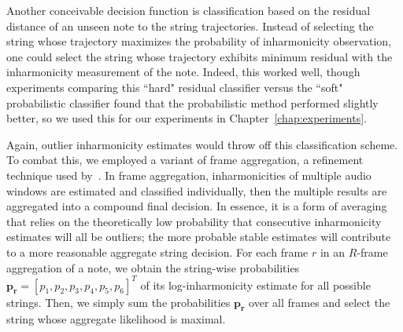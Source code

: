 \documentclass[12pt]{cmuthesis}
\DeclareMathOperator*{\argmax}{arg\,max}
\begin{document}
Another conceivable decision function is classification based on the residual distance of an unseen note to the string trajectories. Instead of selecting the string whose trajectory maximizes the probability of inharmonicity observation, one could select the string whose trajectory exhibits minimum residual with the inharmonicity measurement of the note. Indeed, this worked well, though experiments comparing this ``hard" residual classifier versus the ``soft" probabilistic classifier found that the probabilistic method performed slightly better, so we used this for our experiments in Chapter~\ref{chap:experiments}.

Again, outlier inharmonicity estimates would throw off this classification scheme. To combat this, we employed a variant of frame aggregation, a refinement technique used by~\cite{abesser2012}. In frame aggregation, inharmonicities of multiple audio windows are estimated and classified individually, then the multiple results are aggregated into a compound final decision. In essence, it is a form of averaging that relies on the theoretically low probability that consecutive inharmonicity estimates will all be outliers; the more probable stable estimates will contribute to a more reasonable aggregate string decision. For each frame $r$ in an $R$-frame aggregation of a note, we obtain the string-wise probabilities $\mathbf{p_r} = [p_1,p_2,p_3,p_4,p_5,p_6]^T$ of its log-inharmonicity estimate for all possible strings. Then, we simply sum the probabilities $\mathbf{p_r}$ over all frames and select the string whose aggregate likelihood is maximal.
\end{document}
